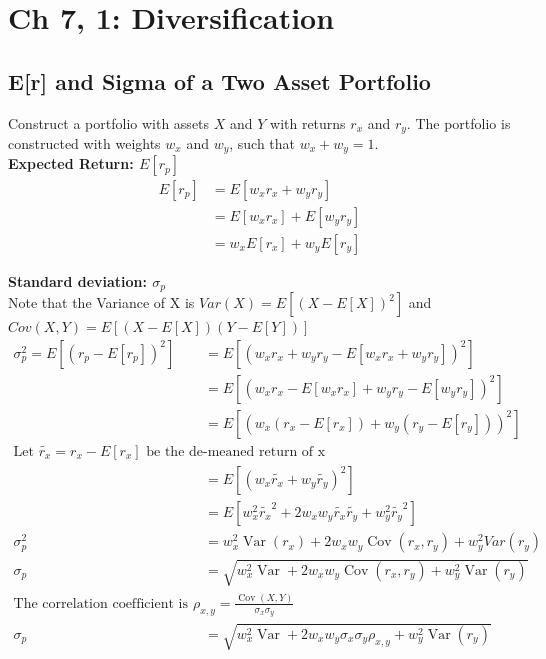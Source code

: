 \documentclass[11pt]{article}
\theoremstyle{definition}
\begin{document}
\section{ Ch 7, 1: Diversification}

    \subsection{E[r] and Sigma of a Two Asset Portfolio}

    Construct a portfolio with assets $X$ and $Y$ with returns $r_x$ and $r_y$.  The portfolio is constructed with weights $w_x$ and $w_y$, such that $w_x + w_y = 1$.\\
     
    \textbf{Expected Return: $E[r_p]$}
    \begin{align*}
        E[r_p] &= E[w_xr_x + w_yr_y]\\
                &= E[w_xr_x] + E[w_yr_y]\\
                &= w_xE[r_x] + w_yE[r_y]
    \end{align*}

    \textbf{Standard deviation: $\sigma_p$}\\
    Note that the Variance of X is $Var(X) = E[(X-E[X])^2]$ and $Cov(X,Y) = E[(X-E[X])(Y-E[Y])]$
        \begin{align*}
           \sigma_p^2 = E[(r_p - E[r_p])^2] &= E[(w_xr_x + w_yr_y - E[w_xr_x + w_yr_y])^2]\\
                    &= E[(w_xr_x - E[w_xr_x] + w_yr_y - E[w_yr_y])^2]\\
                    &= E[(w_x(r_x - E[r_x]) + w_y(r_y - E[r_y]))^2]\\
            \text{Let } \tilde{r_x} = r_x - E[r_x] \text{ be the de-meaned return of x}\\
                    & = E[(w_x\tilde{r_x} + w_y\tilde{r_y})^2]\\
                    & = E[w_x^2\tilde{r_x}^2 + 2w_xw_y\tilde{r_x}\tilde{r_y} + w_y^2\tilde{r_y}^2] \\
                \sigma_p^2    & = w_x^2 \operatorname{Var}(r_x) + 2w_xw_y\operatorname{Cov}(r_x,r_y) + w_y^2Var(r_y) \\
                \sigma_p &= \sqrt{w_x^2 \operatorname{Var} + 2w_xw_y\operatorname{Cov}(r_x,r_y) + w_y^2\operatorname{Var}(r_y)}\\
                \text{The correlation coefficient is defined as: }\rho_{x,y} = \frac{\operatorname{Cov}(X,Y)}{\sigma_x\sigma_y}\\
                \sigma_p &= \sqrt{w_x^2 \operatorname{Var} + 2w_xw_y\sigma_x\sigma_y\rho_{x,y} + w_y^2\operatorname{Var}(r_y)}\\
        \end{align*}
\end{document}
